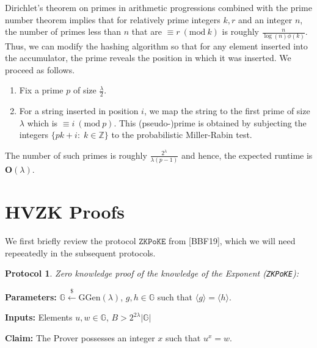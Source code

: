 \documentclass[11pt, lettersize, notitlepage, leqno, footskip=0.6cm]{article}
\newcommand{\bz}{\mathbb Z}
\newcommand{\ttt}{\texttt}
\newcommand{\bG}{\mathbb{G}}
\newcommand{\la}{\langle}
\newcommand{\ra}{\rangle}
\newcommand{\mb}{\mathbb}
\newcommand{\mbf}{\mathbf}
\newcommand{\mr}{\mathrm}
\newcommand{\lam}{\lambda}
\newcommand{\lamb}{\lambda}
\newcommand{\vs}{\vspace{-0.15cm}}
\newcommand{\noin}{\noindent}
\newcommand{\Mod}[1]{\ (\mathrm{mod}\ #1)}
\newtheorem{Prot}[Thm]{Protocol}
\numberwithin{equation}{section}
\begin{document}
Dirichlet's theorem on primes in arithmetic progressions combined with the prime number theorem implies that for relatively prime integers $k,r$ and an integer $n$, the number of primes less than $n$ that are $\equiv r\Mod{k}$ is roughly $\frac{n}{\log(n)\phi(k)}$. Thus, we can modify the hashing algorithm so that for any element inserted into the accumulator, the prime reveals the position in which it was inserted. We proceed as follows.\begin{enumerate}[wide, labelwidth=!, labelindent=0pt]\vspace{-0.1cm} 

\item Fix a prime $p$ of size $\frac{\lam}{2}$. \vs 

\item For a string inserted in position $i$, we map the string to the first prime of size $\lam$ which is $\equiv i\Mod{p}$. This (pseudo-)prime is obtained by subjecting the integers $\{pk+i:\;k\in\bz\}$ to the probabilistic Miller-Rabin test. \end{enumerate} 

\noin The number of such primes is roughly \vs $\frac{2^{\lam}}{\lam (p-1)}$ and hence, the expected runtime is $\mbf{O}(\lam)$.

\section{\fontsize{11}{11}\selectfont HVZK Proofs}

We first briefly review the protocol $\ttt{ZKPoKE}$ from [BBF19], which we will need repeeatedly in the subsequent protocols.

\begin{Prot} \normalfont \hypertarget{ZKPoKE}{\textit{Zero knowledge proof of the knowledge of the Exponent}} (\verb|ZKPoKE|):\end{Prot} \vspace{-0.3cm}

\noin \textbf{Parameters:} $\mb{G}\xleftarrow{\$} \mr{GGen}(\lamb)$,  $g,h\in \mb{G}$ such that $\la g \ra = \la h \ra$.

\noin \textbf{Inputs:} Elements $u,w \in \mb{G}$, $B > 2^{2\lam}|\bG|$

\noin \textbf{Claim:} The Prover possesses an integer $x$ such that $u^x = w$.
\end{document}
